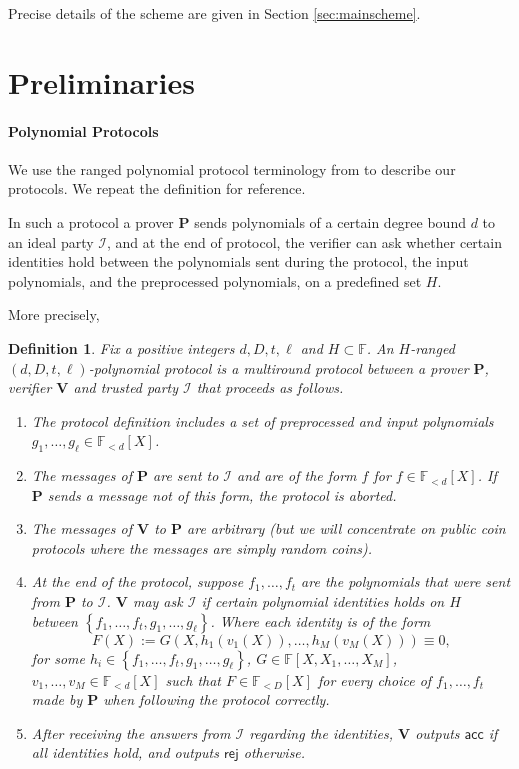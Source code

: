 \documentclass[11pt]{article} %
\newcommand{\F}{\ensuremath{\mathbb F}\xspace}
\newcommand{\rej}{\ensuremath{\mathsf{rej}}\xspace}
\newcommand{\acc}{\ensuremath{\mathsf{acc}}\xspace}
\newcommand{\defeq}{:=}
\newcommand{\prv}{\ensuremath{\mathsf{\mathbf{P}}}\xspace}
\newcommand{\prvpoly}{\ensuremath{\prv}\xspace}
\newcommand{\verpoly}{\ensuremath{\ver}\xspace}%
\newcommand{\ideal}{\ensuremath{\mathcal{I}}\xspace}
\newcommand{\ver}{\ensuremath{\mathsf{\mathbf{V}}}\xspace}
\newcommand{\set}[1]{\ensuremath{\left\{#1\right\}}\xspace}
\newcommand{\polysofdeg}[1]{\ensuremath{\F_{< #1}[X]}\xspace}
\newtheorem{dfn}[lemma]{Definition}
\begin{document}
Precise details of the scheme are given in Section \ref{sec:mainscheme}.

\section{Preliminaries}
\paragraph{Polynomial Protocols}
We use the ranged polynomial protocol terminology from \cite{plonk} to describe our protocols. We repeat the definition for reference.

In such a protocol a prover \prv sends polynomials of a certain degree bound $d$ to an ideal party \ideal, and at the end of protocol, the verifier can ask whether certain identities hold between the polynomials sent during the protocol, the input polynomials, and the preprocessed polynomials, on a predefined set $H$.

More precisely,
\begin{dfn}\label{dfn:polyprotocol}
Fix a positive integers $d,D,t,\ell$ and $H\subset \F$.
An $H$-ranged \emph{$(d,D,t,\ell)$-polynomial protocol} is a multiround protocol between a prover \prvpoly, verifier 
\verpoly and trusted party \ideal that proceeds as follows.

\begin{enumerate}
\item The protocol definition includes a set of \emph{preprocessed and input polynomials} $g_1,\ldots,g_\ell \in \polysofdeg{d}$.

\item The messages of \prvpoly are sent to \ideal and are of the form $f$ for $f\in \polysofdeg{d}$. If \prvpoly sends a message not of this form, the protocol is aborted.
 
 
\item The messages of  \verpoly to \prvpoly are arbitrary (but we will concentrate on public coin protocols where the messages are simply random coins).


 \item At the end of the protocol, suppose $f_1,\ldots,f_t$ are the polynomials that were sent from \prvpoly to \ideal. \verpoly may ask \ideal if certain polynomial identities holds \emph{on $H$} between \set{f_1,\ldots,f_t,g_1,\ldots,g_\ell}.
 Where each identity is of the form
 \[F(X)\defeq G(X, h_1(v_1(X)),\ldots,h_M(v_M(X)))\equiv 0,\]
 for some $h_i\in  \set{f_1,\ldots,f_t,g_1,\ldots,g_\ell}$, $G\in \F[X,X_1,\ldots,X_{M}]$, $v_1,\ldots,v_{M} \in \polysofdeg{d}$
 such that $F\in \polysofdeg{D}$ for every choice of $f_1,\ldots,f_t$ made by \prvpoly when following the protocol correctly.
 
 
 
 \item After receiving the answers from \ideal regarding the identities, \verpoly outputs \acc if all identities hold, and outputs \rej otherwise.

\end{enumerate}
 
\end{dfn}
\end{document}
